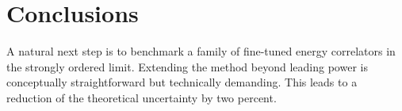 \section{Conclusions}\label{sec:conclusions}

A natural next step is to benchmark a family of fine-tuned energy
correlators in the strongly ordered limit. Extending the method beyond
leading power is conceptually straightforward but technically demanding.
This leads to a reduction of the theoretical uncertainty by two percent.

